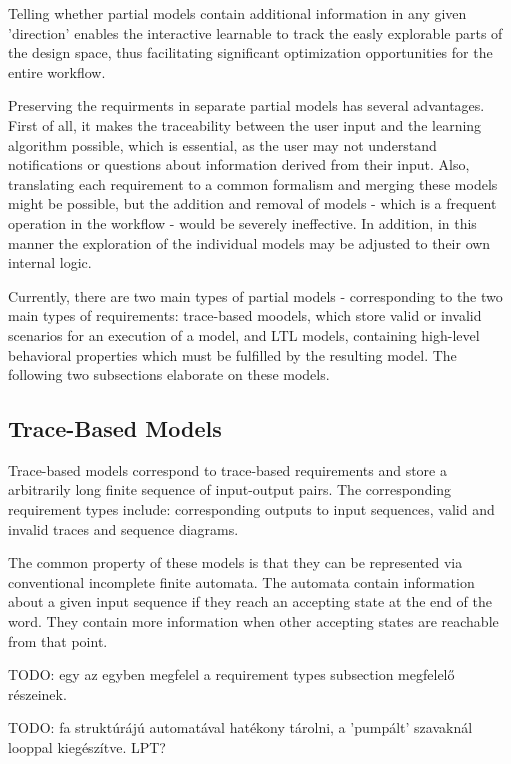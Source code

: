 Telling whether partial models contain additional information in any given 'direction' enables the interactive learnable to track the easly explorable parts of the design space, thus facilitating significant optimization opportunities for the entire workflow.

Preserving the requirments in separate partial models has several advantages. First of all, it makes the traceability between the user input and the learning algorithm possible, which is essential, as the user may not understand notifications or questions about information derived from their input. Also, translating each requirement to a common formalism and merging these models might be possible, but the addition and removal of models - which is a frequent operation in the workflow - would be severely ineffective. In addition, in this manner the exploration of the individual models may be adjusted to their own internal logic.

Currently, there are two main types of partial models - corresponding to the two main types of requirements: trace-based moodels, which store valid or invalid scenarios for an execution of a model, and LTL models, containing high-level behavioral properties which must be fulfilled by the resulting model. The following two subsections elaborate on these models. 

\subsection{Trace-Based Models} \label{subs_traceintheframework}

Trace-based models correspond to trace-based requirements and store a arbitrarily long finite sequence of input-output pairs. The corresponding requirement types include: corresponding outputs to input sequences, valid and invalid traces and sequence diagrams. 

The common property of these models is that they can be represented via conventional incomplete finite automata. The automata contain information about a given input sequence if they reach an accepting state at the end of the word. They contain more information when other accepting states are reachable from that point.

TODO: egy az egyben megfelel a requirement types subsection megfelelő részeinek.

TODO: fa struktúrájú automatával hatékony tárolni, a 'pumpált' szavaknál looppal kiegészítve. LPT?

